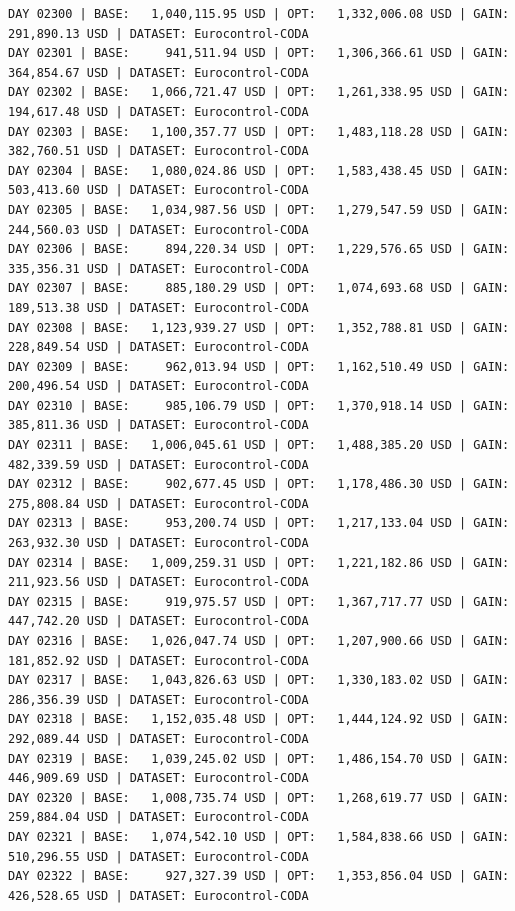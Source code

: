 \documentclass[11pt,a4paper]{article}
\begin{document}
\begin{verbatim}
DAY 02300 | BASE:   1,040,115.95 USD | OPT:   1,332,006.08 USD | GAIN: 291,890.13 USD | DATASET: Eurocontrol-CODA
DAY 02301 | BASE:     941,511.94 USD | OPT:   1,306,366.61 USD | GAIN: 364,854.67 USD | DATASET: Eurocontrol-CODA
DAY 02302 | BASE:   1,066,721.47 USD | OPT:   1,261,338.95 USD | GAIN: 194,617.48 USD | DATASET: Eurocontrol-CODA
DAY 02303 | BASE:   1,100,357.77 USD | OPT:   1,483,118.28 USD | GAIN: 382,760.51 USD | DATASET: Eurocontrol-CODA
DAY 02304 | BASE:   1,080,024.86 USD | OPT:   1,583,438.45 USD | GAIN: 503,413.60 USD | DATASET: Eurocontrol-CODA
DAY 02305 | BASE:   1,034,987.56 USD | OPT:   1,279,547.59 USD | GAIN: 244,560.03 USD | DATASET: Eurocontrol-CODA
DAY 02306 | BASE:     894,220.34 USD | OPT:   1,229,576.65 USD | GAIN: 335,356.31 USD | DATASET: Eurocontrol-CODA
DAY 02307 | BASE:     885,180.29 USD | OPT:   1,074,693.68 USD | GAIN: 189,513.38 USD | DATASET: Eurocontrol-CODA
DAY 02308 | BASE:   1,123,939.27 USD | OPT:   1,352,788.81 USD | GAIN: 228,849.54 USD | DATASET: Eurocontrol-CODA
DAY 02309 | BASE:     962,013.94 USD | OPT:   1,162,510.49 USD | GAIN: 200,496.54 USD | DATASET: Eurocontrol-CODA
DAY 02310 | BASE:     985,106.79 USD | OPT:   1,370,918.14 USD | GAIN: 385,811.36 USD | DATASET: Eurocontrol-CODA
DAY 02311 | BASE:   1,006,045.61 USD | OPT:   1,488,385.20 USD | GAIN: 482,339.59 USD | DATASET: Eurocontrol-CODA
DAY 02312 | BASE:     902,677.45 USD | OPT:   1,178,486.30 USD | GAIN: 275,808.84 USD | DATASET: Eurocontrol-CODA
DAY 02313 | BASE:     953,200.74 USD | OPT:   1,217,133.04 USD | GAIN: 263,932.30 USD | DATASET: Eurocontrol-CODA
DAY 02314 | BASE:   1,009,259.31 USD | OPT:   1,221,182.86 USD | GAIN: 211,923.56 USD | DATASET: Eurocontrol-CODA
DAY 02315 | BASE:     919,975.57 USD | OPT:   1,367,717.77 USD | GAIN: 447,742.20 USD | DATASET: Eurocontrol-CODA
DAY 02316 | BASE:   1,026,047.74 USD | OPT:   1,207,900.66 USD | GAIN: 181,852.92 USD | DATASET: Eurocontrol-CODA
DAY 02317 | BASE:   1,043,826.63 USD | OPT:   1,330,183.02 USD | GAIN: 286,356.39 USD | DATASET: Eurocontrol-CODA
DAY 02318 | BASE:   1,152,035.48 USD | OPT:   1,444,124.92 USD | GAIN: 292,089.44 USD | DATASET: Eurocontrol-CODA
DAY 02319 | BASE:   1,039,245.02 USD | OPT:   1,486,154.70 USD | GAIN: 446,909.69 USD | DATASET: Eurocontrol-CODA
DAY 02320 | BASE:   1,008,735.74 USD | OPT:   1,268,619.77 USD | GAIN: 259,884.04 USD | DATASET: Eurocontrol-CODA
DAY 02321 | BASE:   1,074,542.10 USD | OPT:   1,584,838.66 USD | GAIN: 510,296.55 USD | DATASET: Eurocontrol-CODA
DAY 02322 | BASE:     927,327.39 USD | OPT:   1,353,856.04 USD | GAIN: 426,528.65 USD | DATASET: Eurocontrol-CODA

\end{verbatim}
\end{document}
